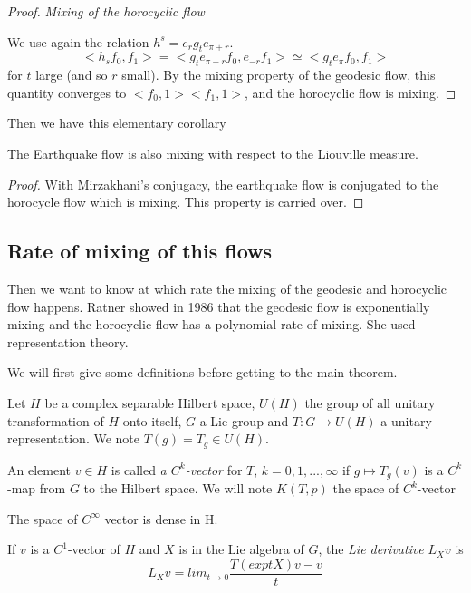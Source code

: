 \begin{proof}
\emph{Mixing of the horocyclic flow}

We use again the relation $h^s = e_r g_t e_{\pi + r}$. \[
<h_s f_0 , f_1 > = < g_t  e_{\pi+r} f_0, e_{-r} f_1> \simeq <g_t e_{\pi} f_0, f_1>
\]
for $t$ large (and so $r$ small). By the mixing property of the geodesic flow, this quantity converges to $<f_0,1><f_1,1>$, and the horocyclic flow is mixing.

\end{proof}


Then we have this elementary corollary

\begin{cor}
The Earthquake flow is also mixing with respect to the Liouville measure.
\end{cor}

\begin{proof}
With Mirzakhani's conjugacy, the earthquake flow is conjugated to the horocycle flow which is mixing. This property is carried over.
\end{proof}

\subsection{Rate of mixing of this flows}

Then we want to know at which rate the mixing of the geodesic and horocyclic flow happens. Ratner showed in 1986 \cite{ratner_1987} that the geodesic flow is exponentially mixing and the horocyclic flow has a polynomial rate of mixing. She used representation theory.

We will first give some definitions before getting to the main theorem.

\begin{dfnt}
Let $H$ be a  complex separable Hilbert space, $U(H)$ the group of all unitary transformation of $H$ onto itself, $G$ a Lie group and $T: G \to U(H)$ a unitary representation. We note $T(g)=T_g \in U(H)$.

An element $v \in H$ is called \emph{a $C^k$-vector} for $T$, $k=0,1,...,\infty$ if $g \mapsto T_g(v)$ is a $C^k$-map from $G$ to the Hilbert space. We will note $K(T,p)$ the space of $C^k$-vector
\end{dfnt}

\begin{rmq}
The space of $C^{\infty}$ vector is dense in H.
\end{rmq}

\begin{dfnt}
If $v$ is a $C^1$-vector of $H$ and $X$ is in the Lie algebra of $G$, the \emph{Lie derivative} $L_X v$ is \[
L_X v =lim_{t \to 0} \frac{T(exp tX)v-v}{t}
\]
\end{dfnt}

